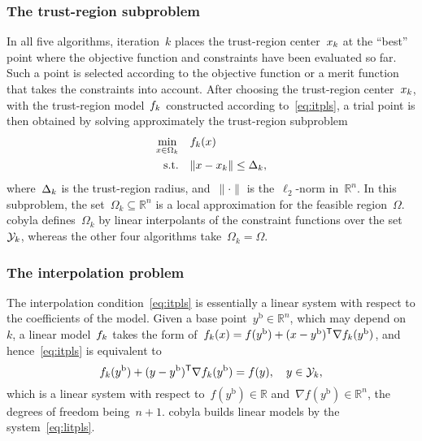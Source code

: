\documentclass[11pt,draft]{article}
\numberwithin{equation}{section}
\newcommand{\R}{\mathbb{R}}
\newcommand{\T}{\mathsf{T}}
\newcommand{\norm}[2][]{#1\lVert#2#1\rVert}
\newcommand{\base}{{\text{b}}}
\newcommand{\fset}{\Omega}
\newcommand{\fsetm}[1][k]{\Omega_{#1}}
\newcommand{\iter}[1][k]{x\ifthenelse{\equal{#1}{}}{}{_{#1}}}
\newcommand{\obj}{f}
\newcommand{\objm}[1][k]{\obj\ifthenelse{\equal{#1}{}}{}{_{#1}}}
\newcommand{\rad}[1][k]{\Delta\ifthenelse{\equal{#1}{}}{}{_{#1}}}
\newcommand{\st}{\text{s.t.}}
\newcommand{\xpt}[1][k]{\mathcal{Y}\ifthenelse{\equal{#1}{}}{}{_{#1}}}
\begin{document}
\subsubsection{The trust-region subproblem}

In all five algorithms, iteration~$k$ places the trust-region center~$\iter$ at the \enquote{best} point where the objective function and constraints have been evaluated so far.
Such a point is selected according to the objective function or a merit function that takes the constraints into account.
After choosing the trust-region center~$\iter$, with the trust-region model~$\objm$ constructed according to~\cref{eq:itpls}, a trial point is then obtained by solving approximately the trust-region subproblem
\begin{equation}
    \label{eq:trsp}
    \begin{split}
        \min_{x \in \fsetm} & \quad \objm(x)\\
        \st                 & \quad \norm{x - \iter} \le \rad,
    \end{split}
\end{equation}
where~$\rad$ is the trust-region radius, and~$\norm{\cdot}$ is the~$\ell_2$-norm in~$\R^n$.
In this subproblem, the set~$\fsetm \subseteq \R^n$ is a local approximation for the feasible region~$\fset$.
\Gls{cobyla} defines~$\fsetm$ by linear interpolants of the constraint functions over the set~$\xpt$, whereas the other four algorithms take~$\fsetm = \fset$.

\subsubsection{The interpolation problem}

The interpolation condition~\cref{eq:itpls} is essentially a linear system with respect to the coefficients of the model.
Given a base point~$y^{\base}\in \R^n$, which may depend on~$k$, a linear model~$\objm$ takes the form of~$\objm(x) = \obj(y^{\base}) + (x - y^{\base})^{\T} \nabla \objm(y^{\base})$,
and hence~\cref{eq:itpls} is equivalent to
\begin{equation}
    \label{eq:litpls}
    \objm(y^{\base}) + (y -y^{\base})^{\T} \nabla \objm(y^{\base})  = \obj(y),  \quad y \in \xpt,
\end{equation}
which is a linear system with respect to~$\obj(y^\base) \in \R$ and~$\nabla \obj(y^\base) \in \R^n$, the degrees of freedom being~$n+1$.
\Gls{cobyla} builds linear models by the system~\cref{eq:litpls}.
\end{document}
